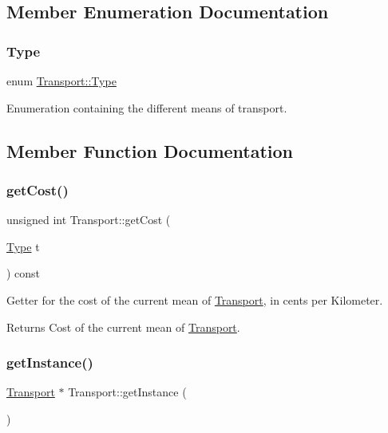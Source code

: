 \subsection{Member Enumeration Documentation}
\hypertarget{class_transport_a1879cecfed0d4238e5a7af6d085db317}{}\label{class_transport_a1879cecfed0d4238e5a7af6d085db317} 
\subsubsection{\texorpdfstring{Type}{Type}}
{\footnotesize\ttfamily enum \hyperlink{class_transport_a1879cecfed0d4238e5a7af6d085db317}{Transport\+::\+Type}}

Enumeration containing the different means of transport. 

\subsection{Member Function Documentation}
\hypertarget{class_transport_a943eecabe9f2435fcbf2bd3a41a4ea3a}{}\label{class_transport_a943eecabe9f2435fcbf2bd3a41a4ea3a} 
\subsubsection{\texorpdfstring{get\+Cost()}{getCost()}}
{\footnotesize\ttfamily unsigned int Transport\+::get\+Cost (\begin{DoxyParamCaption}\item[{\hyperlink{class_transport_a1879cecfed0d4238e5a7af6d085db317}{Type}}]{t }\end{DoxyParamCaption}) const}

Getter for the cost of the current mean of \hyperlink{class_transport}{Transport}, in cents per Kilometer.

\begin{DoxyReturn}{Returns}
Cost of the current mean of \hyperlink{class_transport}{Transport}. 
\end{DoxyReturn}
\hypertarget{class_transport_a2265878b8225332acf586bece5f1b324}{}\label{class_transport_a2265878b8225332acf586bece5f1b324} 
\subsubsection{\texorpdfstring{get\+Instance()}{getInstance()}}
{\footnotesize\ttfamily \hyperlink{class_transport}{Transport} $\ast$ Transport\+::get\+Instance (\begin{DoxyParamCaption}{ }\end{DoxyParamCaption})\hspace{0.3cm}{\ttfamily [static]}}

